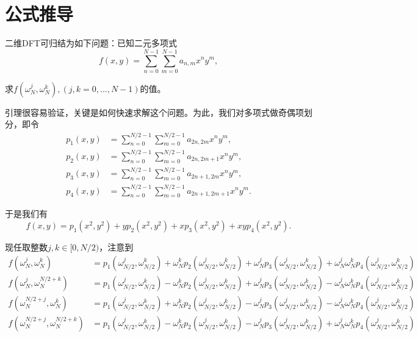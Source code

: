 \documentclass[lang=cn,10pt,bibend=bibtex]{elegantbook}
\begin{document}
\section{公式推导}

\begin{lemma}
    二维DFT可归结为如下问题：已知二元多项式
    \begin{equation*}
        f(x,y)=\sum_{n=0}^{N-1}\sum_{m=0}^{N-1} a_{n,m}x^ny^m,
    \end{equation*}

    求$f(\omega_N^j,\omega_N^k),(j,k=0,...,N-1)$的值。
\end{lemma}

引理很容易验证，关键是如何快速求解这个问题。为此，我们对多项式做奇偶项划分，即令
\begin{align*}
    p_1(x,y)&=\sum_{n=0}^{N/2-1}\sum_{m=0}^{N/2-1} a_{2n,2m}x^ny^m,\\
    p_2(x,y)&=\sum_{n=0}^{N/2-1}\sum_{m=0}^{N/2-1} a_{2n,2m+1}x^ny^m,\\
    p_3(x,y)&=\sum_{n=0}^{N/2-1}\sum_{m=0}^{N/2-1} a_{2n+1,2m}x^ny^m,\\
    p_4(x,y)&=\sum_{n=0}^{N/2-1}\sum_{m=0}^{N/2-1} a_{2n+1,2m+1}x^ny^m.
\end{align*}

于是我们有
\begin{equation*}
    f(x,y)=p_1(x^2,y^2)+yp_2(x^2,y^2)+xp_3(x^2,y^2)+xyp_4(x^2,y^2).
\end{equation*}

现任取整数$j,k\in[0,N/2)$，注意到
\begin{align*}
    f(\omega_N^j,\omega_N^k)&=p_1(\omega_{N/2}^j,\omega_{N/2}^k)+\omega_N^kp_2(\omega_{N/2}^j,\omega_{N/2}^k)+\omega_N^jp_3(\omega_{N/2}^j,\omega_{N/2}^k)+\omega_N^j\omega_N^kp_4(\omega_{N/2}^j,\omega_{N/2}^k)\\
    f(\omega_N^j,\omega_N^{N/2+k})&=p_1(\omega_{N/2}^j,\omega_{N/2}^k)-\omega_N^kp_2(\omega_{N/2}^j,\omega_{N/2}^k)+\omega_N^jp_3(\omega_{N/2}^j,\omega_{N/2}^k)-\omega_N^j\omega_N^kp_4(\omega_{N/2}^j,\omega_{N/2}^k)\\
    f(\omega_N^{N/2+j},\omega_N^k)&=p_1(\omega_{N/2}^j,\omega_{N/2}^k)+\omega_N^kp_2(\omega_{N/2}^j,\omega_{N/2}^k)-\omega_N^jp_3(\omega_{N/2}^j,\omega_{N/2}^k)-\omega_N^j\omega_N^kp_4(\omega_{N/2}^j,\omega_{N/2}^k)\\
    f(\omega_N^{N/2+j},\omega_N^{N/2+k})&=p_1(\omega_{N/2}^j,\omega_{N/2}^k)-\omega_N^kp_2(\omega_{N/2}^j,\omega_{N/2}^k)-\omega_N^jp_3(\omega_{N/2}^j,\omega_{N/2}^k)+\omega_N^j\omega_N^kp_4(\omega_{N/2}^j,\omega_{N/2}^k)\\
\end{align*}
\end{document}
